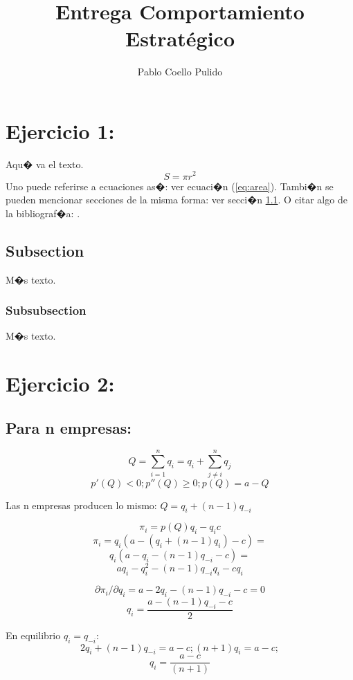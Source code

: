 \documentclass{article}
\title{Entrega Comportamiento Estrat\'egico}
\author{Pablo Coello Pulido\\
}
\theoremstyle{definition}
\theoremstyle{remark}
\begin{document}
\maketitle


\section{Ejercicio 1:}

Aqu� va el texto.
\begin{equation}\label{eq:area}
  S = \pi r^2
\end{equation}
Uno puede referirse a ecuaciones as�: ver ecuaci�n (\ref{eq:area}).
Tambi�n se pueden mencionar secciones de la misma forma: ver secci�n
\ref{sec:nada}. O citar algo de la bibliograf�a: \cite{Cd94}.

\subsection{Subsection}\label{sec:nada}

M�s texto.

\subsubsection{Subsubsection}\label{sec:nada2}

M�s texto.
\section{Ejercicio 2:}
\subsection{Para n empresas:}

$$Q=\sum_{i=1}^nq_i=q_i+\sum_{j\neq i}^nq_j$$
$$p'(Q)<0; p''(Q)\geq0; p(Q)=a-Q$$

Las n empresas producen lo mismo: $Q=q_i+(n-1)q_{-i}$

$$\pi_i=p(Q)q_i-q_ic$$
$$\pi_i=q_i(a-(q_i+(n-1)q_i)-c)=$$
$$q_i(a-q_i-(n-1)q_{-i}-c)=$$
$$aq_i-q_i^2-(n-1)q_{-i}q_i-cq_i$$

$$\partial \pi_i/\partial q_i= a-2q_i-(n-1)q_{-i}-c=0$$
$$q_i=\frac{a-(n-1)q_{-i}-c}{2}$$

En equilibrio $q_i=q_{-i}$:
$$2q_i+(n-1)q_{-i}=a-c; (n+1)q_i=a-c;$$
$$q_i=\frac{a-c}{(n+1)}$$
\end{document}
